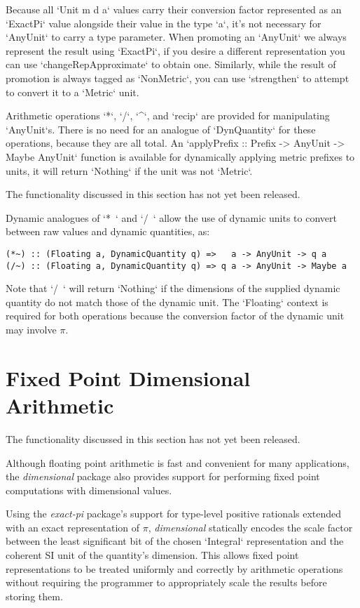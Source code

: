 \documentclass[11pt]{report}
\newcommand{\packagename}[1]{\textit{#1}}
\newcommand{\thispackage}{\packagename{dimensional}}
\newcommand{\prerelease}{\begin{framed}
The functionality discussed in this section has not yet been released.
\end{framed}}
\begin{document}
Because all `Unit m d a` values carry their conversion factor represented as an `ExactPi` value alongside their value in
the type `a`, it's not necessary for `AnyUnit` to carry a type parameter. When promoting an `AnyUnit` we always represent
the result using `ExactPi`, if you desire a different representation you can use `changeRepApproximate` to obtain one.
Similarly, while the result of promotion is always tagged as `NonMetric`, you can use `strengthen` to attempt to convert
it to a `Metric` unit.

Arithmetic operations `*`, `/`, `^`, and `recip` are provided for manipulating `AnyUnit`s. There is no need for an analogue
of `DynQuantity` for these operations, because they are all total. An `applyPrefix :: Prefix -> AnyUnit -> Maybe AnyUnit`
function is available for dynamically applying metric prefixes to units, it will return `Nothing` if the unit was not `Metric`.

\prerelease{}

Dynamic analogues of `*~` and `/~` allow the use of dynamic units to convert between raw values and dynamic quantities, as:

\begin{lstlisting}
(*~) :: (Floating a, DynamicQuantity q) =>   a -> AnyUnit -> q a
(/~) :: (Floating a, DynamicQuantity q) => q a -> AnyUnit -> Maybe a
\end{lstlisting}

Note that `/~` will return `Nothing` if the dimensions of the supplied dynamic quantity do not match those of the
dynamic unit. The `Floating` context is required for both operations because the conversion factor of the
dynamic unit may involve $ \pi $.



\chapter{Fixed Point Dimensional Arithmetic}

\prerelease{}

Although floating point arithmetic is fast and convenient for many applications, the \thispackage{} package also provides
support for performing fixed point computations with dimensional values.

Using the \packagename{exact-pi} package's support for type-level positive rationals extended with an exact representation
of $ \pi $, \thispackage{} statically encodes the scale factor between the least significant bit of the chosen `Integral`
representation and the coherent SI unit of the quantity's dimension. This allows fixed point representations to be
treated uniformly and correctly by arithmetic operations without requiring the programmer to appropriately scale the results
before storing them.
\end{document}
